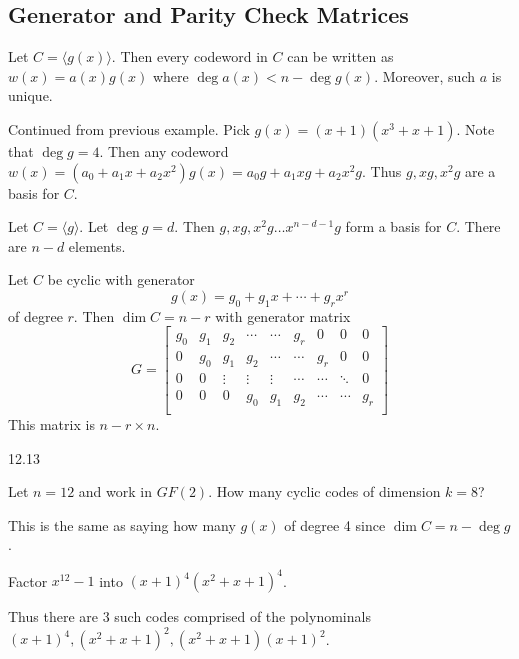 \documentclass{article}
\begin{document}
\subsection{Generator and Parity Check Matrices}
\begin{theorem}
  Let \( C = \langle g(x) \rangle\).
  Then every codeword in \( C \) can be written as \( w(x) = a(x)g(x) \) where \( \deg a(x) < n - \deg g(x) \). Moreover, such \( a  \) is unique.
\end{theorem}
\begin{example}
  Continued from previous example. Pick \( g(x) = (x+1)(x^3+x+1) \). Note that \( \deg g = 4 \). Then any codeword \( w(x) = (a_0 + a_1x + a_2x^2)g(x) = a_0g + a_1xg + a_2x^2g \). Thus \( g, xg, x^2g \) are a basis for \( C \).
\end{example}
\begin{theorem}
  Let \( C = \langle g \rangle \). Let \( \deg g = d \).  Then \( g, xg, x^2g \dots x^{n-d-1}g  \) form a basis for \( C  \). There are \( n-d  \) elements.
\end{theorem}
\begin{theorem}\label{foo}
  Let \( C  \) be cyclic with generator \[
    g(x) = g_0 + g_1x + \cdots  + g_rx^r
  \] of degree \( r  \). Then \( \dim C = n-r \) with generator matrix \[
    G =
    \begin{bmatrix}
      g_0 & g_1 & g_2 & \cdots&  \cdots & g_r & 0 & 0 & 0\\
      0 & g_0 & g_1 & g_2 & \cdots&  \cdots & g_r & 0 & 0\\
      0 & 0 & \vdots & \vdots & \vdots & \cdots&  \cdots & \ddots & 0\\
      0 & 0 & 0 & g_0 & g_1 & g_2 & \cdots&  \cdots & g_r\\
    \end{bmatrix}
  \]
  This matrix is \( n-r\times n \).
\end{theorem}
\begin{example}
  12.13
\end{example}
\begin{example}
  Let \( n=12 \) and work in \( GF(2) \). How many cyclic codes of dimension \( k=8 \)?

  This is the same as saying how many \( g(x) \) of degree 4 since \( \dim C = n - \deg g \).

  Factor \( x^{12} - 1 \) into \( (x+1)^4(x^2+x+1)^4 \).

  Thus there are 3 such codes comprised of the polynominals \( (x+1)^4, (x^2+x+1)^2, (x^2+x+1)(x+1)^2 \).
\end{example}
\end{document}
